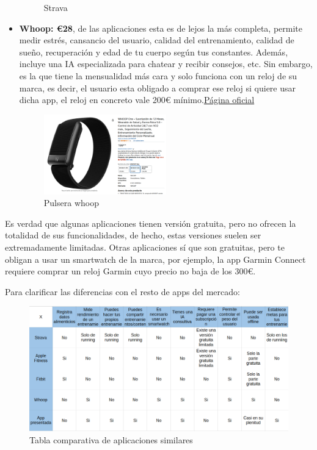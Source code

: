 \begin{itemize}
\begin{figure}[H]
    \caption{Strava}
    \label{fig:Strava}
\end{figure} 
	\item \textbf{Whoop: €28}, de las aplicaciones esta es de lejos la más completa, permite medir estrés, cansancio del usuario, calidad del entrenamiento, calidad de sueño, recuperación y edad de tu cuerpo según tus constantes. Además, incluye una IA especializada para chatear y recibir consejos, etc. Sin embargo, es la que tiene la mensualidad más cara y solo funciona con un reloj de su marca, es decir, el usuario esta obligado a comprar ese reloj si quiere usar dicha app, el reloj en concreto vale 200€ mínimo.\href{https://www.whoop.com/us/en/}{Página oficial}
\begin{figure}[H]
   \centering
    \includegraphics[width=0.5\textwidth]{fotos/Pulsera whoop.png}
    \caption{Pulsera whoop}
    \label{fig:Pulsera whoop}
\end{figure} 
\end{itemize}

Es verdad que algunas aplicaciones tienen versión gratuita, pero no ofrecen la totalidad de sus funcionalidades, de hecho, estas versiones suelen ser extremadamente limitadas. Otras aplicaciones sí que son gratuitas, pero te obligan a usar un smartwatch de la marca, por ejemplo, la app Garmin Connect requiere comprar un reloj Garmin cuyo precio no baja de los 300€.

Para clarificar las diferencias con el resto de apps del mercado:

\begin{landscape}
\begin{figure}[H]
   \centering
    \includegraphics[width=1.65\textwidth]{tablas/tabla.png}
    \caption{Tabla comparativa de aplicaciones similares}
    \label{fig:Tabla comparativa}
\end{figure} 
\end{landscape}

